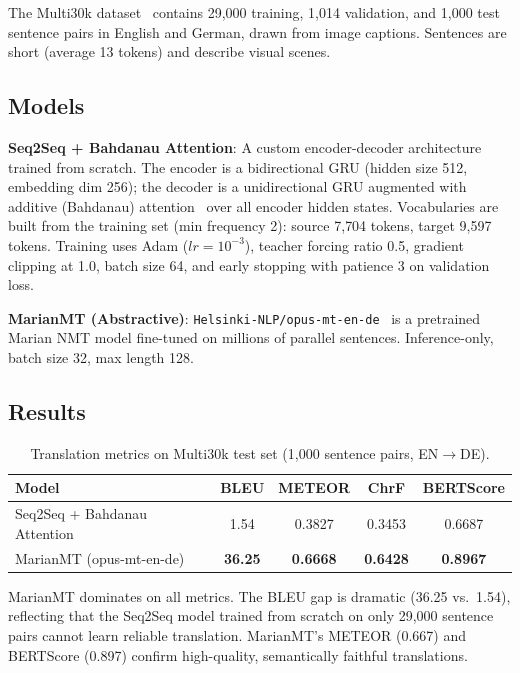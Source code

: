 \documentclass[12pt,a4paper]{article}
\begin{document}
The Multi30k dataset~\citep{elliott2016multi30k} contains 29{,}000 training, 1{,}014 validation, and 1{,}000 test sentence pairs in English and German, drawn from image captions. Sentences are short (average 13 tokens) and describe visual scenes.

\subsection{Models}

\textbf{Seq2Seq + Bahdanau Attention}: A custom encoder-decoder architecture trained from scratch. The encoder is a bidirectional GRU (hidden size 512, embedding dim 256); the decoder is a unidirectional GRU augmented with additive (Bahdanau) attention~\citep{bahdanau2015attention} over all encoder hidden states. Vocabularies are built from the training set (min frequency 2): source 7{,}704 tokens, target 9{,}597 tokens. Training uses Adam ($lr=10^{-3}$), teacher forcing ratio 0.5, gradient clipping at 1.0, batch size 64, and early stopping with patience 3 on validation loss.

\textbf{MarianMT (Abstractive)}: \texttt{Helsinki-NLP/opus-mt-en-de}~\citep{tiedemann2020opus} is a pretrained Marian NMT model fine-tuned on millions of parallel sentences. Inference-only, batch size 32, max length 128.

\subsection{Results}

\begin{table}[H]
\centering
\caption{Translation metrics on Multi30k test set (1{,}000 sentence pairs, EN$\rightarrow$DE).}
\label{tab:q4_results}
\begin{tabular}{lcccc}
\toprule
\textbf{Model} & \textbf{BLEU} & \textbf{METEOR} & \textbf{ChrF} & \textbf{BERTScore} \\
\midrule
Seq2Seq + Bahdanau Attention & 1.54 & 0.3827 & 0.3453 & 0.6687 \\
MarianMT (opus-mt-en-de)     & \textbf{36.25} & \textbf{0.6668} & \textbf{0.6428} & \textbf{0.8967} \\
\bottomrule
\end{tabular}
\end{table}

MarianMT dominates on all metrics. The BLEU gap is dramatic (36.25 vs.\ 1.54), reflecting that the Seq2Seq model trained from scratch on only 29{,}000 sentence pairs cannot learn reliable translation. MarianMT's METEOR (0.667) and BERTScore (0.897) confirm high-quality, semantically faithful translations.
\end{document}
